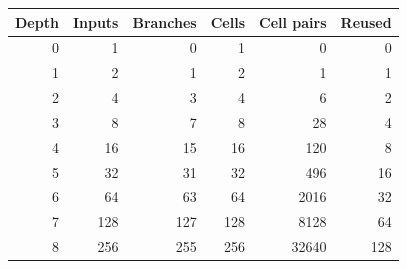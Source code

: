 \begin{tabular}{rrrrrr}
\toprule
Depth & Inputs & Branches & Cells & Cell pairs & Reused \\
\midrule
0 & 1 & 0 & 1 & 0 & 0 \\
1 & 2 & 1 & 2 & 1 & 1 \\
2 & 4 & 3 & 4 & 6 & 2 \\
3 & 8 & 7 & 8 & 28 & 4 \\
4 & 16 & 15 & 16 & 120 & 8 \\
5 & 32 & 31 & 32 & 496 & 16 \\
6 & 64 & 63 & 64 & 2016 & 32 \\
7 & 128 & 127 & 128 & 8128 & 64 \\
8 & 256 & 255 & 256 & 32640 & 128 \\
\bottomrule
\end{tabular}
